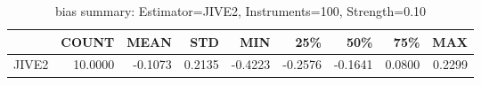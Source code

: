 \begin{table}[ht]
\centering
\caption{bias summary: Estimator=JIVE2, Instruments=100, Strength=0.10}
\begin{tabular}{lrrrrrrrr}
\toprule
 & COUNT & MEAN & STD & MIN & 25\% & 50\% & 75\% & MAX \\
\midrule
JIVE2 & 10.0000 & -0.1073 & 0.2135 & -0.4223 & -0.2576 & -0.1641 & 0.0800 & 0.2299 \\
\bottomrule
\end{tabular}
\end{table}
